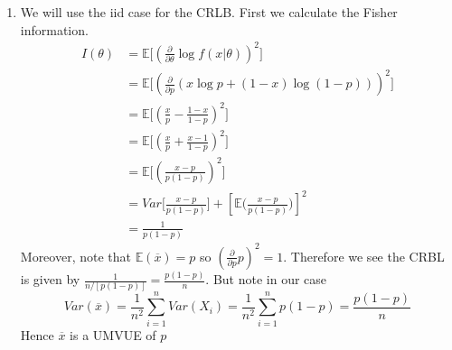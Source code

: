\documentclass[12pt]{article}  %
\newcommand{\E}{{\mathbb{E}}}
\begin{document}
\begin{enumerate}
\item We will use the iid case for the CRLB. First we calculate the Fisher information. 
\begin{align*}
I(\theta) &= \E\Big[\left(\frac{\partial}{\partial\theta}\log f(x|\theta)\right)^2\Big]\\
&= \E\Big[\left(\frac{\partial}{\partial p}(x\log p + (1-x)\log(1-p))\right)^2\Big]\\
&= \E\Big[\left(\frac{x}{p}- \frac{1-x}{1-p}\right)^2\Big]\\
&= \E\Big[\left(\frac{x}{p}+ \frac{x-1}{1-p}\right)^2\Big]\\
&= \E\Big[\left(\frac{x-p}{p(1-p)}\right)^2\Big]\\
&= Var\Big[\frac{x-p}{p(1-p)}\Big] + \left[\E\Big(\frac{x-p}{p(1-p)}\Big)\right]^2\\
&= \frac{1}{p(1-p)}
\end{align*}
Moreover, note that $\E(\overline{x}) = p$ so $\left(\frac{\partial}{\partial p} p\right)^2 = 1$. Therefore we see the CRBL is given by $\frac{1}{n/[p(1-p)]} = \frac{p(1-p)}{n}$. But note in our case $$Var(\overline{x}) = \frac{1}{n^2}\sum_{i=1}^nVar(X_i) = \frac{1}{n^2}\sum_{i=1}^np(1-p) = \frac{p(1-p)}{n}$$ 
Hence $\overline{x}$ is a UMVUE of $p$


\end{enumerate}
\end{document}
